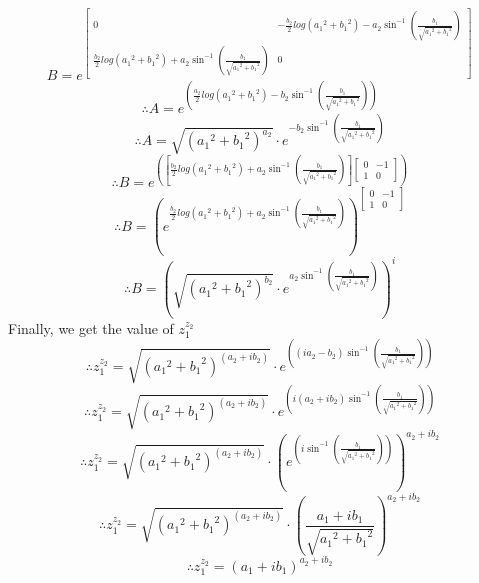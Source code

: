 \documentclass[12pt]{article}
\begin{document}
    $$ B = e^{
        \begin{bmatrix} 
            0 & - \frac{b_2}{2}log({a_{1}}^2 + {b_{1}}^2) - {a_2}\sin^{-1}\left({\frac{b_1}{\sqrt{{a_1}^2 + {b_1}^2}}}\right) \\ 
            \frac{b_2}{2}log({a_{1}}^2 + {b_{1}}^2) + {a_2}\sin^{-1}\left({\frac{b_1}{\sqrt{{a_1}^2 + {b_1}^2}}}\right) & 0
        \end{bmatrix}
    }
    $$
    $$ \therefore A = e^{\left(\frac{a_2}{2}log({a_{1}}^2 + {b_{1}}^2) - {b_2}\sin^{-1}\left({\frac{b_1}{\sqrt{{a_1}^2 + {b_1}^2}}}\right)\right)} $$
    $$ \therefore A = \sqrt{{\left({a_1}^{2} + {b_1}^{2}\right)}^{a_2}} \cdot e^{- {b_2}\sin^{-1}\left({\frac{b_1}{\sqrt{{a_1}^2 + {b_1}^2}}}\right)}$$
    $$ \therefore B = e^{\left(\left[
        \frac{b_2}{2}log({a_{1}}^2 + {b_{1}}^2) + {a_2}\sin^{-1}\left({\frac{b_1}{\sqrt{{a_1}^2 + {b_1}^2}}}\right)\right] \begin{bmatrix} 
            0 & - 1 \\ 
            1 & 0
        \end{bmatrix}
    \right)} $$
    $$ \therefore
    B = {\left(
        e^{
            \frac{b_2}{2}log({a_{1}}^2 + {b_{1}}^2) + {a_2}\sin^{-1}\left({\frac{b_1}{\sqrt{{a_1}^2 + {b_1}^2}}}\right)
        }
    \right)}^{\begin{bmatrix} 
        0 & - 1 \\ 
        1 & 0
    \end{bmatrix}}
    $$
    $$ \therefore B = 
    {\left(
        \sqrt{{\left({a_1}^{2} + {b_1}^{2}\right)}^{b_2}} \cdot
        e^{{a_2}\sin^{-1}\left({\frac{b_1}{\sqrt{{a_1}^2 + {b_1}^2}}}\right)}
    \right)}^{i}
    $$
    Finally, we get the value of $ z_{1}^{z_{2}} $ 
    $$ \therefore
    z_{1}^{z_{2}} = \sqrt{{\left({a_1}^{2} + {b_1}^{2}\right)}^{\left(a_{2} + ib_{2}\right)}} \cdot
    e^{\left((i{a_2} - b_{2})\sin^{-1}\left({\frac{b_1}{\sqrt{{a_1}^2 + {b_1}^2}}}\right)\right)}
    $$
    $$ \therefore
    z_{1}^{z_{2}} = \sqrt{{\left({a_1}^{2} + {b_1}^{2}\right)}^{\left(a_{2} + ib_{2}\right)}} \cdot
    e^{\left(i({a_2} + ib_{2})\sin^{-1}\left({\frac{b_1}{\sqrt{{a_1}^2 + {b_1}^2}}}\right)\right)}
    $$
    $$ \therefore
    z_{1}^{z_{2}} = \sqrt{{\left({a_1}^{2} + {b_1}^{2}\right)}^{\left(a_{2} + ib_{2}\right)}} \cdot
    {\left(e^{\left(i\sin^{-1}\left({\frac{b_1}{\sqrt{{a_1}^2 + {b_1}^2}}}\right)\right)}\right)}^{a_{2} + ib_{2}}
    $$
    $$ \therefore 
    z_{1}^{z_{2}} = \sqrt{{\left({a_1}^{2} + {b_1}^{2}\right)}^{\left(a_{2} + ib_{2}\right)}} \cdot
    {\left(\frac{a_{1}+ib_{1}}{\sqrt{{a_1}^2 + {b_1}^2}}\right)}^{a_{2} + ib_{2}}
    $$
    $$ \therefore
    z_{1}^{z_{2}} = {\left(a_1 + ib_1\right)}^{a_{2} + ib_{2}}
    $$
\end{document}

